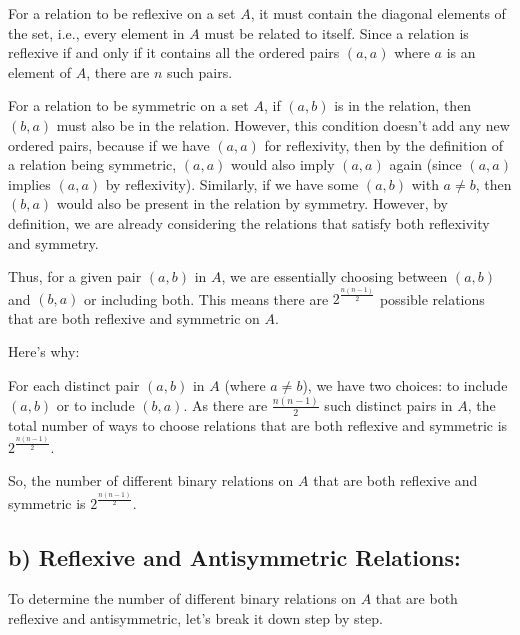 \documentclass[12pt]{article}
\begin{document}
For a relation to be reflexive on a set \( A \), it must contain the diagonal elements of the set, i.e., every element in \( A \) must be related to itself. Since a relation is reflexive if and only if it contains all the ordered pairs \( (a,a) \) where \( a \) is an element of \( A \), there are \( n \) such pairs.

For a relation to be symmetric on a set \( A \), if \( (a,b) \) is in the relation, then \( (b,a) \) must also be in the relation. However, this condition doesn't add any new ordered pairs, because if we have \( (a,a) \) for reflexivity, then by the definition of a relation being symmetric, \( (a,a) \) would also imply \( (a,a) \) again (since \( (a,a) \) implies \( (a,a) \) by reflexivity). Similarly, if we have some \( (a,b) \) with \( a \neq b \), then \( (b,a) \) would also be present in the relation by symmetry. However, by definition, we are already considering the relations that satisfy both reflexivity and symmetry.

Thus, for a given pair \( (a,b) \) in \( A \), we are essentially choosing between \( (a,b) \) and \( (b,a) \) or including both. This means there are \( 2^{\frac{n(n-1)}{2}} \) possible relations that are both reflexive and symmetric on \( A \).

Here's why:

For each distinct pair \( (a,b) \) in \( A \) (where \( a \neq b \)), we have two choices: to include \( (a,b) \) or to include \( (b,a) \). As there are \( \frac{n(n-1)}{2} \) such distinct pairs in \( A \), the total number of ways to choose relations that are both reflexive and symmetric is \( 2^{\frac{n(n-1)}{2}} \).

So, the number of different binary relations on \( A \) that are both reflexive and symmetric is \( 2^{\frac{n(n-1)}{2}} \).


\subsection*{b) Reflexive and Antisymmetric Relations:}

To determine the number of different binary relations on \( A \) that are both reflexive and antisymmetric, let's break it down step by step.
\end{document}
